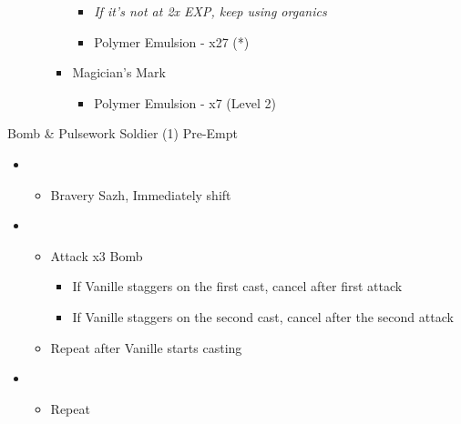 \begin{multicols}{2}
\begin{upgrade}
\begin{itemize}
\begin{itemize}
\begin{itemize}
\begin{itemize}
                \item \textit{If it's not at 2x EXP, keep using organics}
                \item Polymer Emulsion - x27 (*)
            \end{itemize}
		\item Magician's Mark
		\begin{itemize}
			\item Polymer Emulsion - x7 (Level 2)
		\end{itemize}
        \end{itemize}
    \end{itemize}
\end{itemize}
\end{upgrade}

\begin{battle}{Bomb \& Pulsework Soldier (1) Pre-Empt}
\begin{itemize}
    \item \second
    \begin{itemize}
        \item Bravery Sazh, Immediately shift
    \end{itemize}
    \item \third
    \begin{itemize}
        \item Attack x3 Bomb
        \begin{itemize}
            \item If Vanille staggers on the first cast, cancel after first attack
            \item If Vanille staggers on the second cast, cancel after the second attack
        \end{itemize}
        \item Repeat after Vanille starts casting
    \end{itemize}
    \item \first
    \begin{itemize}
        \item Repeat
    \end{itemize}
\end{itemize}
\end{battle}


\end{multicols}
